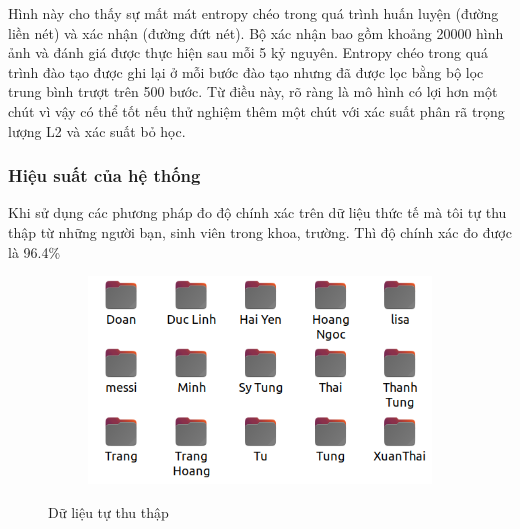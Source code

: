\newpage
Hình này cho thấy sự mất mát entropy chéo trong quá trình huấn luyện (đường liền nét) và xác nhận (đường đứt nét). Bộ xác nhận bao gồm khoảng 20000 hình ảnh và đánh giá được thực hiện sau mỗi 5 kỷ nguyên. Entropy chéo trong quá trình đào tạo được ghi lại ở mỗi bước đào tạo nhưng đã được lọc bằng bộ lọc trung bình trượt trên 500 bước. Từ điều này, rõ ràng là mô hình có lợi hơn một chút vì vậy có thể tốt nếu thử nghiệm thêm một chút với xác suất phân rã trọng lượng L2 và xác suất bỏ học.

\newpage
\subsubsection{Hiệu suất của hệ thống}

Khi sử dụng các phương pháp đo độ chính xác trên dữ liệu thức tế mà tôi tự thu thập từ
những người bạn, sinh viên trong khoa, trường. Thì độ chính xác đo được là 96.4\%

\begin{figure}
    \begin{subfigure}{0.6\textwidth}
        \includegraphics[width=1.0\linewidth]{Chapters/items/dataset.png}
        \label{fig:dataset}
    \end{subfigure}
    \caption{Dữ liệu tự thu thập}
\end{figure}
